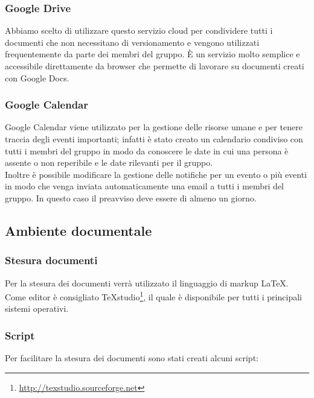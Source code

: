 \subsubsection{\gls{Google Drive}}

Abbiamo scelto di utilizzare questo \gls{servizio cloud} per condividere tutti i documenti che non necessitano di \gls{versionamento} e vengono utilizzati frequentemente da parte dei membri del gruppo. 
È un servizio molto semplice e accessibile direttamente da \gls{browser} che permette di lavorare su documenti creati con \gls{Google Docs}.

\subsubsection{Google Calendar}
\gls{Google Calendar} viene utilizzato per la gestione delle risorse umane e per tenere traccia degli eventi importanti; infatti è stato creato un calendario condiviso con tutti i membri del gruppo in modo da conoscere le date in cui una persona è assente o non reperibile e le date rilevanti per il gruppo.\\
Inoltre è possibile modificare la gestione delle notifiche per un evento o più eventi in modo che venga inviata automaticamente una email a tutti i membri del gruppo. In questo caso il preavviso deve essere di almeno un giorno.

\subsection{Ambiente documentale}

\subsubsection{Stesura documenti}

Per la stesura dei documenti verrà utilizzato il \gls{linguaggio di markup} \LaTeX.
Come editor è consigliato TeXstudio\footnote{\url{http://texstudio.sourceforge.net}}, il quale è disponibile per tutti i principali sistemi operativi.

\subsubsection{Script}

Per facilitare la stesura dei documenti sono stati creati alcuni script:

